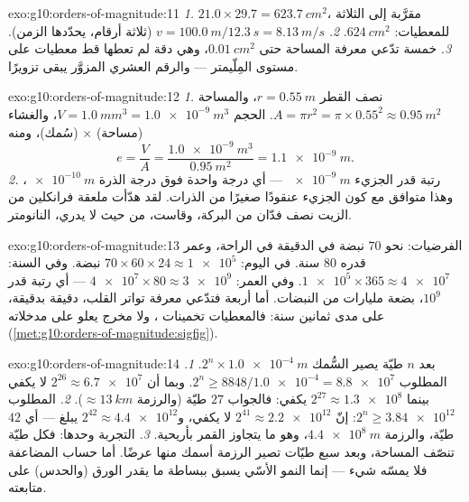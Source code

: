 \begin{solution}{exo:g10:orders-of-magnitude:11}
\emph{1.} $21.0 \times 29.7 = \qty{623.7}{cm^2}$، مقرَّبة إلى 
الثلاثة للمعطيات: $\qty{624}{cm^2}$.
\emph{2.} $v = \qty{100.0}{m}/\qty{12.3}{s} = \qty{8.13}{m/s}$ (ثلاثة
أرقام، يحدّدها الزمن).
\emph{3.} خمسة  تدّعي معرفة المساحة حتى
$\qty{0.01}{cm^2}$، وهي دقة لم تعطها قط معطيات على مستوى
المِلّيمتر --- والرقم العشري المزوَّر يبقى تزويرًا.
\end{solution}

\begin{solution}{exo:g10:orders-of-magnitude:12}
\emph{1.} نصف القطر $r = \qty{0.55}{m}$، والمساحة
$A = \pi r^{2} = \pi \times 0.55^{2} \approx \qty{0.95}{m^2}$. الحجم
$V = \qty{1.0}{mm^3} = \qty{1.0e-9}{m^3}$، والغشاء (مساحة)
$\times$ (سُمك)، ومنه
\[
e = \frac{V}{A} = \frac{\qty{1.0e-9}{m^3}}{\qty{0.95}{m^2}}
= \qty{1.1e-9}{m} .
\]
\emph{2.} رتبة قدر الجزيء $\qty{e-9}{m}$ --- أي درجة واحدة فوق
درجة الذرة $\qty{e-10}{m}$، وهذا متوافق مع كون الجزيء عنقودًا
صغيرًا من الذرات. لقد هدّأت ملعقة فرانكلين من الزيت نصف فدّان من
البركة، وقاست، من حيث لا يدري، النانومتر.
\end{solution}

\begin{solution}{exo:g10:orders-of-magnitude:13}
الفرضيات: نحو $70$ نبضة في الدقيقة في الراحة، وعمر قدره $80$
سنة. في اليوم: $70 \times 60 \times 24 \approx \num{1e5}$ نبضة. وفي
السنة: $\num{1e5} \times 365 \approx \num{4e7}$. وفي العمر:
$\num{4e7} \times 80 \approx \num{3e9}$ --- أي رتبة قدر
$10^{9}$، بضعة مليارات من النبضات. أما أربعة  فتدّعي
معرفة تواتر القلب، دقيقة بدقيقة، على مدى ثمانين سنة:
فالمعطيات تخمينات ، ولا مخرج يعلو على
مدخلاته (\cref{met:g10:orders-of-magnitude:sigfig}).
\end{solution}

\begin{solution}{exo:g10:orders-of-magnitude:14}
بعد $n$ طيّة يصير السُّمك $2^{n} \times \qty{1.0e-4}{m}$.
\emph{1.} المطلوب $2^{n} \geq 8848/\num{1.0e-4} = \num{8.8e7}$. وبما أن
$2^{26} \approx \num{6.7e7}$ لا يكفي بينما
$2^{27} \approx \num{1.3e8}$ يكفي: فالجواب $27$ طيّة (والرزمة
$\approx \qty{13}{km}$).
\emph{2.} المطلوب $2^{n} \geq \num{3.84e12}$: إنّ $2^{41} \approx
\num{2.2e12}$ لا يكفي، و$2^{42} \approx \num{4.4e12}$ يبلغ ---
أي $42$ طيّة، والرزمة $\qty{4.4e8}{m}$، وهو ما يتجاوز القمر بأريحية.
\emph{3.} التجربة وحدها: فكل طيّة تنصّف المساحة، وبعد
سبع طيّات تصير الرزمة أسمك منها عرضًا. أما حساب
المضاعفة فلا يمسّه شيء --- إنما النمو الأسّي يسبق ببساطة ما يقدر
الورق (والحدس) على متابعته.
\end{solution}

